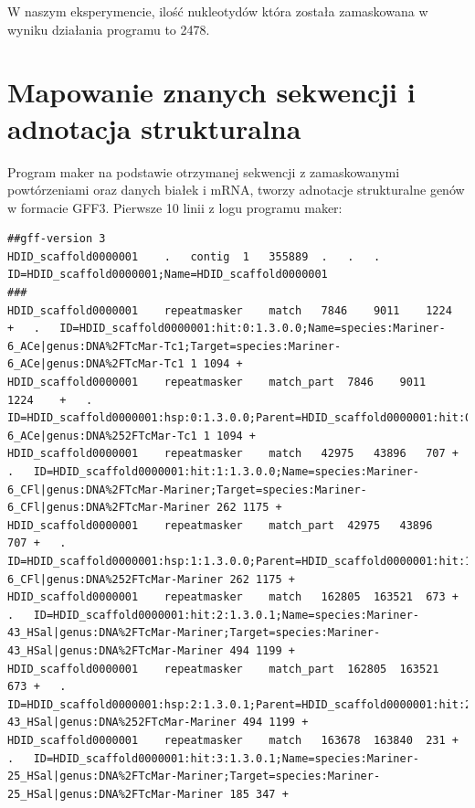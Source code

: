 \documentclass[a4paper]{article}
\begin{document}
W naszym eksperymencie, ilość nukleotydów która została zamaskowana w wyniku działania programu to 2478.

\section{Mapowanie znanych sekwencji i adnotacja strukturalna}


Program maker na podstawie otrzymanej sekwencji z zamaskowanymi powtórzeniami
oraz danych białek i mRNA, tworzy adnotacje strukturalne genów w formacie GFF3.
Pierwsze 10 linii z logu programu maker:
\begin{lstlisting}
##gff-version 3
HDID_scaffold0000001	.	contig	1	355889	.	.	.	ID=HDID_scaffold0000001;Name=HDID_scaffold0000001
###
HDID_scaffold0000001	repeatmasker	match	7846	9011	1224	+	.	ID=HDID_scaffold0000001:hit:0:1.3.0.0;Name=species:Mariner-6_ACe|genus:DNA%2FTcMar-Tc1;Target=species:Mariner-6_ACe|genus:DNA%2FTcMar-Tc1 1 1094 +
HDID_scaffold0000001	repeatmasker	match_part	7846	9011	1224	+	.	ID=HDID_scaffold0000001:hsp:0:1.3.0.0;Parent=HDID_scaffold0000001:hit:0:1.3.0.0;Target=species:Mariner-6_ACe|genus:DNA%252FTcMar-Tc1 1 1094 +
HDID_scaffold0000001	repeatmasker	match	42975	43896	707	+	.	ID=HDID_scaffold0000001:hit:1:1.3.0.0;Name=species:Mariner-6_CFl|genus:DNA%2FTcMar-Mariner;Target=species:Mariner-6_CFl|genus:DNA%2FTcMar-Mariner 262 1175 +
HDID_scaffold0000001	repeatmasker	match_part	42975	43896	707	+	.	ID=HDID_scaffold0000001:hsp:1:1.3.0.0;Parent=HDID_scaffold0000001:hit:1:1.3.0.0;Target=species:Mariner-6_CFl|genus:DNA%252FTcMar-Mariner 262 1175 +
HDID_scaffold0000001	repeatmasker	match	162805	163521	673	+	.	ID=HDID_scaffold0000001:hit:2:1.3.0.1;Name=species:Mariner-43_HSal|genus:DNA%2FTcMar-Mariner;Target=species:Mariner-43_HSal|genus:DNA%2FTcMar-Mariner 494 1199 +
HDID_scaffold0000001	repeatmasker	match_part	162805	163521	673	+	.	ID=HDID_scaffold0000001:hsp:2:1.3.0.1;Parent=HDID_scaffold0000001:hit:2:1.3.0.1;Target=species:Mariner-43_HSal|genus:DNA%252FTcMar-Mariner 494 1199 +
HDID_scaffold0000001	repeatmasker	match	163678	163840	231	+	.	ID=HDID_scaffold0000001:hit:3:1.3.0.1;Name=species:Mariner-25_HSal|genus:DNA%2FTcMar-Mariner;Target=species:Mariner-25_HSal|genus:DNA%2FTcMar-Mariner 185 347 +
\end{lstlisting}
\end{document}

